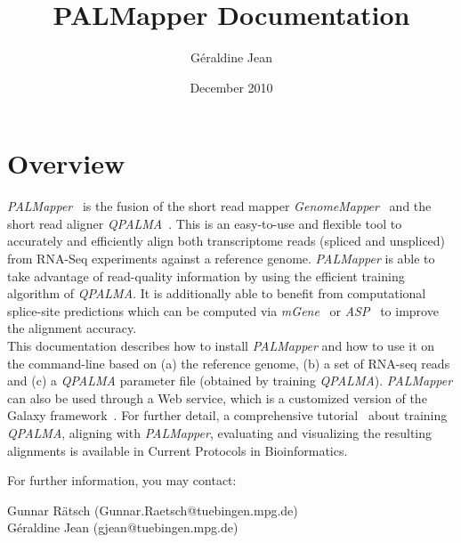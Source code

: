 \documentclass{article}
\begin{document}
\newcommand{\PALMA}{{\sl PALMA}}
\newcommand{\PALMapper}{{\sl PALMapper}}
\newcommand{\GM}{{\sl GenomeMapper}}
\newcommand{\Galaxy}{{\sl Galaxy}}
\newcommand{\mGene}{{\sl mGene}}
\newcommand{\ASP}{{\sl ASP}}
\newcommand{\evaluationToolbox}{{\sl evaluationToolbox}}
\newcommand{\QP}{{\sl QPALMA}}
\newcommand{\QPA}{{\sl QPALMA alignment algorithm }}
\newcommand{\QPH}{{\sl QPALMA approximation }}
\newcommand{\QPP}{{\sl QPALMA pipeline }}
\newcommand{\qparam}[1]{{\bf #1}}



\setlength{\parindent}{0cm}


\title{PALMapper Documentation}
\author{G\'eraldine Jean}
\date{December 2010}

\maketitle
%
%
%

\section{Overview}
\label{sec:overview}

\PALMapper{}~\cite{Palmapper} is the fusion of the short read mapper
\GM{}~\cite{GenomeMapper} and the short read aligner
\QP{}~\cite{DeBona08}. This is an easy-to-use and flexible tool 
to accurately and efficiently align both transcriptome reads (spliced 
and unspliced) from RNA-Seq experiments against a reference
genome. \PALMapper{} is able to take advantage of read-quality 
information by using the efficient training algorithm of \QP{}. It is
additionally able to benefit from computational splice-site
predictions which can be computed via
\mGene{}~\cite{Schweikertetal09,Schweikertetal09b} or
\ASP{}~\cite{Sonnenburgetal07} to improve the alignment accuracy.\\ 
This documentation describes how to install \PALMapper{} and how to
use it on the command-line based on (a) the reference genome, (b) a 
set of RNA-seq reads and (c) a \QP{} parameter file (obtained by
training \QP{}). \PALMapper{} can also be used through a Web service,
which is a customized version of the Galaxy
framework~\cite{Galaxy1,Galaxy2,Galaxy3}. For further detail, a
comprehensive tutorial~\cite{Palmapper} about 
training \QP{}, aligning with \PALMapper{}, evaluating and visualizing
the resulting alignments is available in Current Protocols in
Bioinformatics. 

For further information, you may contact:
\begin{center}
Gunnar R\"atsch (Gunnar.Raetsch@tuebingen.mpg.de)\\
G\'eraldine Jean (gjean@tuebingen.mpg.de)
\end{center}
\end{document}
